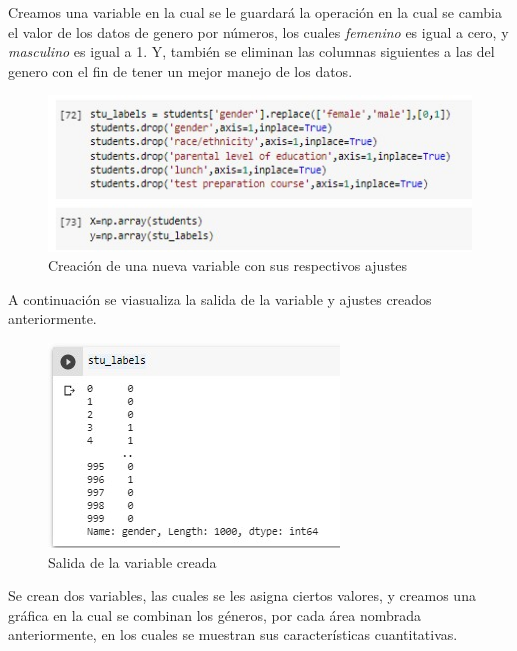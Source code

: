 \documentclass[conference,compsoc,onecolumn]{IEEEtran}
\begin{document}
        Creamos una variable en la cual se le guardará la operación en la cual se cambia el valor de los datos de genero por números, los cuales \textit {femenino} es igual a cero, y \textit{masculino} es igual a 1. Y, también se eliminan las columnas siguientes a las del genero con el fin de tener un mejor manejo de los datos.
        
        \begin{figure}[H]       
            \centering
            \includegraphics[scale = 0.70]{se.jpg}
            \caption{Creación de una nueva variable con sus respectivos ajustes}
            \label{subfigura16}
        \end{figure}
        
        A continuación se viasualiza la salida de la variable y ajustes creados anteriormente.
        
        
        \begin{figure}[H]       
            \centering
            \includegraphics[scale = 0.70]{gen.jpg}
            \caption{Salida de la variable creada}
            \label{subfigura16}
        \end{figure}
        
        Se crean  dos variables, las cuales se les asigna ciertos valores, y creamos una gráfica en la cual se combinan los géneros, por cada área nombrada anteriormente, en los cuales se muestran sus características cuantitativas.
        
\end{document}
